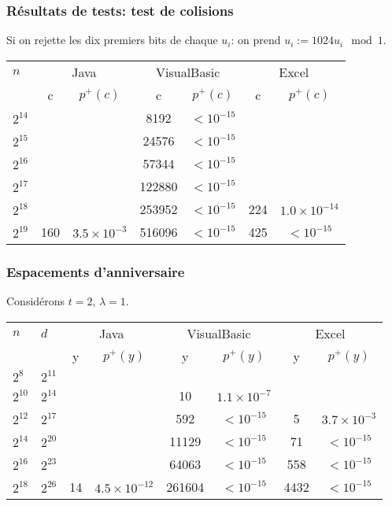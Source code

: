 \documentclass[t,usepdftitle=false]{beamer}
\def\eps {$< 10^{-15}$}
\begin{document}
\begin{frame}
\frametitle{Résultats de tests: test de colisions}

Si on rejette les dix premiers bits de chaque $u_i$: on prend $u_i :=
1024 u_i \mod 1$.

\begin {table}[h]
\centering
\begin {tabular}{|l|cc|cc|cc|}
\hline
 \rule{0pt}{11pt} $n$  &  
\multicolumn{2}{c|}{Java} & 
\multicolumn{2}{c|}{VisualBasic} & 
\multicolumn{2}{c|}{Excel} \\
 \rule{0pt}{11pt} & c & $p^+(c)$ & c & $p^+(c)$ & c & $p^+(c)$ \\
\hline
  $2^{14}$     &    &       & 8192  & \eps   &   & \rule{0pt}{11pt}\\
  $2^{15}$     &    &       & 24576  &  \eps   &   & \\
  $2^{16}$     &    &       & 57344  &  \eps   &   & \\
  $2^{17}$     &    &       & 122880  &  \eps   &   & \\
  $2^{18}$     &    &       & 253952  &  \eps   & 224 & $1.0\times 10^{-14}$\\
  $2^{19}$     &160 & $3.5\times 10^{-3}$ & 516096  & \eps   & 425 & \eps \\
\hline
\end {tabular}
\end {table}


\end{frame}

\begin{frame}
\frametitle{Espacements d'anniversaire}

Considérons $t=2$, $\lambda = 1$.

\hspace{-1cm}
\begin{small}
\begin {tabular}{|ll|cc|cc|cc|}
\hline
 \rule{0pt}{11pt} $n$  &  $d$ &
\multicolumn{2}{c|}{Java} & 
\multicolumn{2}{c|}{VisualBasic} & 
\multicolumn{2}{c|}{Excel} \\
\rule{0pt}{11pt} && y & $p^+(y)$ & y & $p^+(y)$ & y & $p^+(y)$\\
\hline
 $2^{8}$  & $2^{11}$  &  & &    &  &  &  \rule{0pt}{13pt} \\
 $2^{10}$ & $2^{14}$  &  & & 10   & $1.1\times 10^{-7}$ &  & \\
 $2^{12}$ & $2^{17}$  &  & & 592  &\eps  & 5 & $3.7\times 10^{-3}$ \\
 $2^{14}$ & $2^{20}$  &  & & 11129   & \eps & 71 & \eps \\
 $2^{16}$ & $2^{23}$  &  & & 64063   & \eps & 558  & \eps \\
 $2^{18}$ & $2^{26}$ &14& $4.5\times 10^{-12}$ & 261604 & \eps & 4432 &\eps\\
\hline
\end {tabular}
\end{small}

\end{frame}
\end{document}

